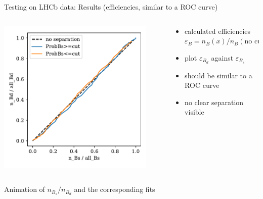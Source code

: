 \documentclass[aspectratio=1610, 10pt]{beamer}
\begin{document}
\begin{frame}{Testing on LHCb data: Results (efficiencies, similar to a ROC curve)}
  \begin{columns}
    \begin{column}{0.5\textwidth}
      \centering
      \includegraphics[width=0.9\textwidth]{images/data_roc.pdf}
    \end{column}
    \begin{column}{0.5\textwidth}
      \begin{itemize}
        \item calculated efficiencies $\varepsilon_B = n_B(x)/n_B(\text{no cut})$
        \item plot $\varepsilon_{B_d}$ against $\varepsilon_{B_s}$
        \item should be similar to a ROC curve
        \item no clear separation visible
      \end{itemize}
    \end{column}
  \end{columns}
\end{frame}

\begin{frame}{Animation of $n_{B_s}/n_{B_d}$ and the corresponding fits}
\end{frame}
\end{document}
